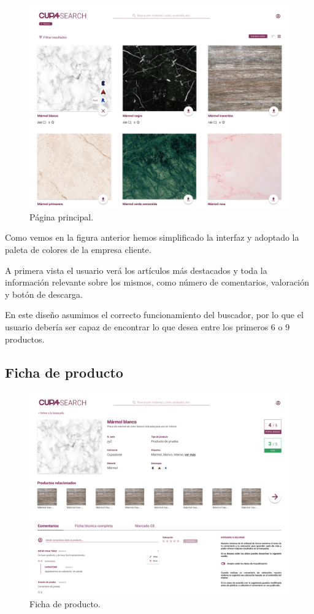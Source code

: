 \begin{figure}[H]
	\centering
	\includegraphics[width=1\textwidth]{imaxes/redHome.png}
	\caption{Página principal.}
	\label{redhome}
\end{figure}

Como vemos en la figura anterior hemos simplificado la interfaz y adoptado la paleta de colores de la empresa cliente.

A primera vista el usuario verá los artículos más destacados y toda la información relevante sobre los mismos, como número de comentarios, valoración y botón de descarga.

En este diseño asumimos el correcto funcionamiento del buscador, por lo que el usuario debería ser capaz de encontrar lo que desea entre los primeros 6 o 9 productos.

\subsection{Ficha de producto}

\begin{figure}[H]
	\centering
	\includegraphics[width=1\textwidth]{imaxes/redProdDet.png}
	\caption{Ficha de producto.}
	\label{redProd}
\end{figure}

